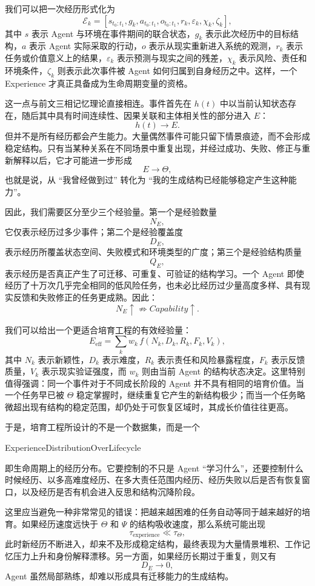 我们可以把一次经历形式化为
\[
\mathcal{E}_k
=
\left[
s_{t_0:t_1},
g_k,
a_{t_0:t_1},
o_{t_0:t_1},
r_k,
\varepsilon_k,
\chi_k,
\zeta_k
\right],
\]
其中 $s$ 表示 Agent 与环境在事件期间的联合状态，$g_k$ 表示此次经历中的目标结构，$a$ 表示 Agent 实际采取的行动，$o$ 表示从现实重新进入系统的观测，$r_k$ 表示任务或价值意义上的结果，$\varepsilon_k$ 表示预测与现实之间的残差，$\chi_k$ 表示风险、责任和环境条件，$\zeta_k$ 则表示此次事件被 Agent 如何归属到自身经历之中。这样，一个 Experience 才真正具备成为生命周期变量的资格。

这一点与前文三相记忆理论直接相连。事件首先在 $h(t)$ 中以当前认知状态存在，随后其中具有时间连续性、因果关联和主体相关性的部分进入 $E$：
\[
h(t)
\rightarrow
E.
\]
但并不是所有经历都会产生能力。大量偶然事件可能只留下情景痕迹，而不会形成稳定结构。只有当某种关系在不同场景中重复出现，并经过成功、失败、修正与重新解释以后，它才可能进一步形成
\[
E
\rightarrow
\Theta,
\]
也就是说，从 ``我曾经做到过'' 转化为 ``我的生成结构已经能够稳定产生这种能力''。

因此，我们需要区分至少三个经验量。第一个是经验数量
\[
N_E,
\]
它仅表示经历过多少事件；第二个是经验覆盖度
\[
D_E,
\]
表示经历所覆盖状态空间、失败模式和环境类型的广度；第三个是经验结构质量
\[
Q_E,
\]
表示经历是否真正产生了可迁移、可重复、可验证的结构学习。一个 Agent 即使经历了十万次几乎完全相同的低风险任务，也未必比经历过少量高度多样、具有现实反馈和失败修正的任务更成熟。因此：
\[
N_E\uparrow
\not\Rightarrow
Capability\uparrow.
\]

我们可以给出一个更适合培育工程的有效经验量：
\[
E_{\mathrm{eff}}
=
\sum_{k}
w_k
\,
f(
N_k,
D_k,
R_k,
F_k,
V_k
),
\]
其中 $N_k$ 表示新颖性，$D_k$ 表示难度，$R_k$ 表示责任和风险暴露程度，$F_k$ 表示反馈质量，$V_k$ 表示现实验证强度，而 $w_k$ 则由当前 Agent 的结构状态决定。这里特别值得强调：同一个事件对于不同成长阶段的 Agent 并不具有相同的培育价值。当一个任务早已被 $\Theta$ 稳定掌握时，继续重复它产生的新结构极少；而当一个任务略微超出现有结构的稳定范围，却仍处于可恢复区域时，其成长价值往往更高。

于是，培育工程所设计的不是一个数据集，而是一个
\begin{statementbox}
ExperienceDistributionOverLifecycle
\end{statementbox}
即生命周期上的经历分布。它要控制的不只是 Agent ``学习什么''，还要控制什么时候经历、以多高难度经历、在多大责任范围内经历、经历失败以后是否有恢复窗口，以及经历是否有机会进入反思和结构沉降阶段。

这里应当避免一种非常常见的错误：把越来越困难的任务自动等同于越来越好的培育。如果经历速度远快于 $\Theta$ 和 $\Psi$ 的结构吸收速度，那么系统可能出现
\[
\tau_{\mathrm{experience}}
\ll
\tau_{\Theta},
\]
此时新经历不断进入，却来不及形成稳定结构，最终表现为大量情景堆积、工作记忆压力上升和身份解释漂移。另一方面，如果经历长期过于重复，则又有
\[
D_E\rightarrow 0,
\]
Agent 虽然局部熟练，却难以形成具有迁移能力的生成结构。

